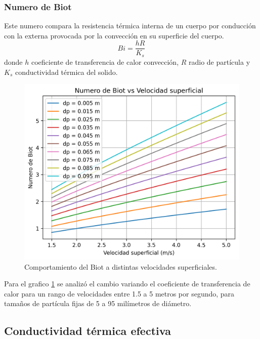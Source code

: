 \documentclass[12pt,letterpaper,final]{article}%
\begin{document}
\subsubsection{Numero de Biot}
Este numero compara la resistencia térmica interna de un cuerpo por conducción con la  externa provocada por la convección en su superficie del cuerpo\cite{Ramachadran1984}.
\begin{equation}\label{Ecu_biot}
Bi = \frac{hR}{K_s}	
\end{equation}
donde $h$ coeficiente de transferencia de calor convección, $R$ radio de partícula y $K_s$ conductividad térmica del solido.
\begin{figure}[h!]
	\centering
	\includegraphics[scale=0.9]{nBiot_us}
	\caption{Comportamiento del Biot a distintas velocidades superficiales.}
	\label{fig:Biot_us}
\end{figure}
Para el grafico \ref{fig:Biot_us} se analizó el cambio variando el coeficiente de transferencia de calor para un rango de velocidades entre 1.5 a 5 metros por segundo, para tamaños de partícula fijas de 5 a 95 milímetros de diámetro.
\newpage
\subsection{Conductividad térmica efectiva}
\end{document}
